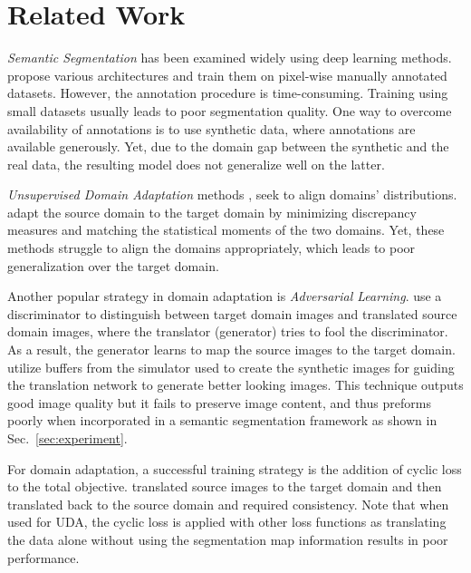 \documentclass[letterpaper]{article} \usepackage[]{aaai23}  \usepackage{times}  \usepackage{helvet}  \usepackage{courier}  \usepackage[hyphens]{url}  \usepackage{graphicx} \urlstyle{rm} \def\UrlFont{\rm}  \usepackage{natbib}  \usepackage{caption} \frenchspacing  \setlength{\pdfpagewidth}{8.5in} \setlength{\pdfpageheight}{11in} \usepackage{algorithm}
\begin{document}
\section{Related Work}

\textit{Semantic Segmentation} has been examined widely using deep learning methods. \citet{long2015fully, yu2015multi, chen2017deeplab, zhao2017pyramid} propose various architectures and train them on pixel-wise manually annotated datasets. However, the annotation procedure is time-consuming. Training using small datasets usually leads to poor segmentation quality. One way to overcome availability of annotations is to use synthetic data, where annotations are available generously. Yet, due to the domain gap between the synthetic and the real data, the resulting model does not generalize well on the latter.

\textit{Unsupervised Domain Adaptation} methods \cite{hoffman2018cycada,wang2018deep, gao2021dsp, zhang2019category,Wilson2020UDA}, seek to align domains' distributions. \citet{zellinger2017central, geng2011daml, mancini2018boosting} adapt the source domain to the target domain by minimizing discrepancy measures and matching the statistical moments of the two domains. Yet, these methods struggle to align the domains appropriately, which leads to poor generalization over the target domain.

Another popular strategy in domain adaptation is \textit{Adversarial Learning}. \citet{ganin2015unsupervised, tzeng2017adversarial, shu2018dirt, kumar2018co} use a discriminator to distinguish between target domain images and translated source domain images, where the translator (generator) tries to fool the discriminator. As a result, the generator learns to map the source images to the target domain. \citet{richter2021enhancing} utilize buffers from the simulator used to create the synthetic images for guiding the translation network to generate better looking images. This technique outputs good image quality but it fails to preserve image content, and thus preforms poorly when incorporated in a semantic segmentation framework as shown in Sec.~\ref{sec:experiment}.  

For domain adaptation, a successful training strategy is the addition of cyclic loss to the total objective. \citet{hoffman2018cycada, zhu2017unpaired, yi2017dualgan} translated source images to the target domain and then translated back to the source domain and required consistency. Note that when used for UDA, the cyclic loss is applied with other loss functions as translating the data alone without using the segmentation map information results in poor performance.
\end{document}
